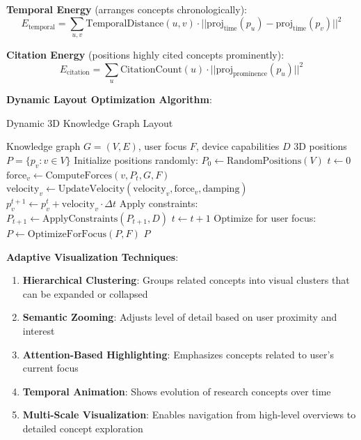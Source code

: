 \documentclass[10pt,twocolumn]{article}
\begin{document}
\textbf{Temporal Energy} (arranges concepts chronologically):
\begin{equation}
E_{\text{temporal}} = \sum_{u,v} \text{TemporalDistance}(u,v) \cdot ||\text{proj}_{\text{time}}(p_u) - \text{proj}_{\text{time}}(p_v)||^2
\end{equation}

\textbf{Citation Energy} (positions highly cited concepts prominently):
\begin{equation}
E_{\text{citation}} = \sum_{u} \text{CitationCount}(u) \cdot ||\text{proj}_{\text{prominence}}(p_u)||^2
\end{equation}

\textbf{Dynamic Layout Optimization Algorithm}:

\begin{algorithm}[H]
\caption{Dynamic 3D Knowledge Graph Layout}
\label{alg:3d_layout}
\begin{algorithmic}[1]
\REQUIRE Knowledge graph $G = (V, E)$, user focus $F$, device capabilities $D$
\ENSURE 3D positions $P = \{p_v : v \in V\}$
\STATE Initialize positions randomly: $P_0 \leftarrow \text{RandomPositions}(V)$
\STATE $t \leftarrow 0$
        \STATE $\text{force}_v \leftarrow \text{ComputeForces}(v, P_t, G, F)$
        \STATE $\text{velocity}_v \leftarrow \text{UpdateVelocity}(\text{velocity}_v, \text{force}_v, \text{damping})$
        \STATE $p_v^{t+1} \leftarrow p_v^t + \text{velocity}_v \cdot \Delta t$
    \ENDFOR
    \STATE Apply constraints: $P_{t+1} \leftarrow \text{ApplyConstraints}(P_{t+1}, D)$
    \STATE $t \leftarrow t + 1$
\ENDFOR
\STATE Optimize for user focus: $P \leftarrow \text{OptimizeForFocus}(P, F)$
\RETURN $P$
\end{algorithmic}
\end{algorithm}

\textbf{Adaptive Visualization Techniques}:

\begin{enumerate}
    \item \textbf{Hierarchical Clustering}: Groups related concepts into visual clusters that can be expanded or collapsed
    \item \textbf{Semantic Zooming}: Adjusts level of detail based on user proximity and interest
    \item \textbf{Attention-Based Highlighting}: Emphasizes concepts related to user's current focus
    \item \textbf{Temporal Animation}: Shows evolution of research concepts over time
    \item \textbf{Multi-Scale Visualization}: Enables navigation from high-level overviews to detailed concept exploration
\end{enumerate}
\end{document}
